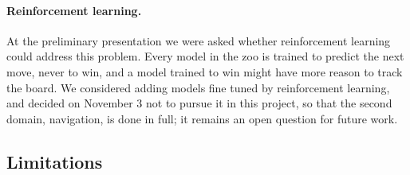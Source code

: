 \documentclass[11pt]{scrartcl}
\begin{document}
\paragraph{Reinforcement learning.} At the preliminary presentation we were asked whether reinforcement
learning could address this problem. Every model in the zoo is trained to predict the next move, never to win,
and a model trained to win might have more reason to track the board. We considered adding models fine tuned
by reinforcement learning, and decided on November 3 not to pursue it in this project, so
that the second domain, navigation, is done in full; it remains an open question for future work.

\subsection{Limitations}
\label{sec:limitations}
\end{document}
